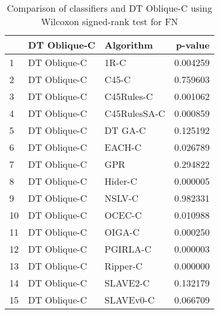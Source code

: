 \begin{table}
\footnotesize
\caption{Comparison of classifiers and DT Oblique-C using Wilcoxon signed-rank test for FN}
\label{tab:DT Oblique-C wilcoxon FN comparison}
\begin{tabular}{lllr}
\hline
 & DT Oblique-C & Algorithm & p-value \\
\hline
1 & DT Oblique-C & 1R-C & 0.004259 \\
2 & DT Oblique-C & C45-C & 0.759603 \\
3 & DT Oblique-C & C45Rules-C & 0.001062 \\
4 & DT Oblique-C & C45RulesSA-C & 0.000859 \\
5 & DT Oblique-C & DT GA-C & 0.125192 \\
6 & DT Oblique-C & EACH-C & 0.026789 \\
7 & DT Oblique-C & GPR & 0.294822 \\
8 & DT Oblique-C & Hider-C & 0.000005 \\
9 & DT Oblique-C & NSLV-C & 0.982331 \\
10 & DT Oblique-C & OCEC-C & 0.010988 \\
11 & DT Oblique-C & OIGA-C & 0.000250 \\
12 & DT Oblique-C & PGIRLA-C & 0.000003 \\
13 & DT Oblique-C & Ripper-C & 0.000000 \\
14 & DT Oblique-C & SLAVE2-C & 0.132179 \\
15 & DT Oblique-C & SLAVEv0-C & 0.066709 \\
\hline
\end{tabular}
\end{table}
